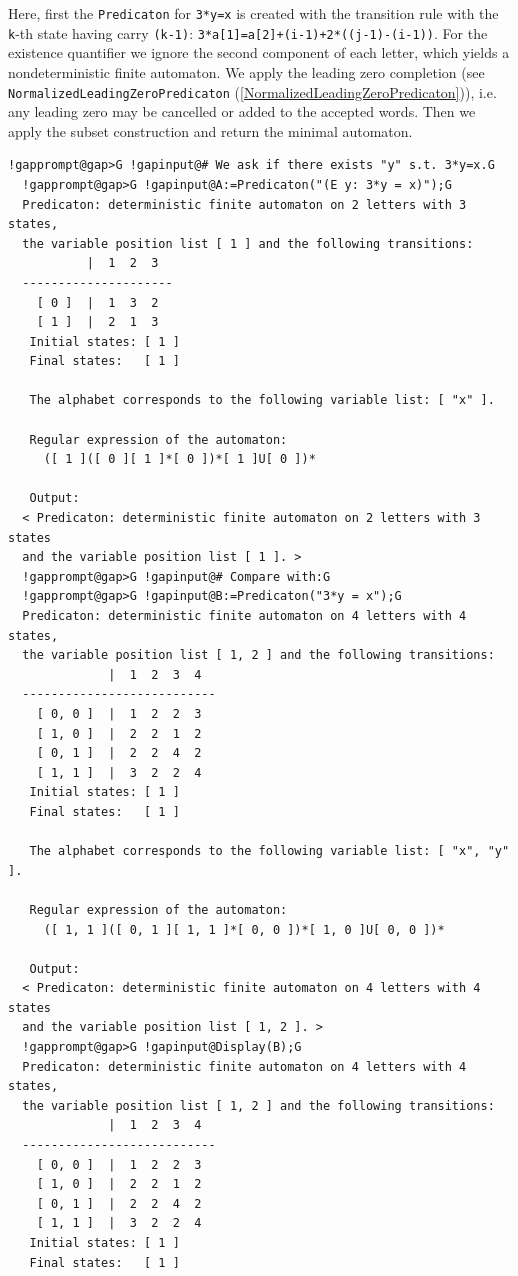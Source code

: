 \documentclass[a4paper,11pt]{report}
\begin{document}
{{{ Here, first the \texttt{Predicaton} for \texttt{3*y=x} is created with the transition rule with the \texttt{k}-th state having carry \texttt{(k-1)}: \texttt{3*a[1]=a[2]+(i-1)+2*((j-1)-(i-1))}. For the existence quantifier we ignore the second component of each letter,
which yields a nondeterministic finite automaton. We apply the leading zero
completion (see \texttt{NormalizedLeadingZeroPredicaton} (\ref{NormalizedLeadingZeroPredicaton})), i.e. any leading zero may be cancelled or added to the accepted words. Then
we apply the subset construction and return the minimal automaton. 
\begin{Verbatim}[commandchars=!@G,fontsize=\small,frame=single,label=Example]
  !gapprompt@gap>G !gapinput@# We ask if there exists "y" s.t. 3*y=x.G
  !gapprompt@gap>G !gapinput@A:=Predicaton("(E y: 3*y = x)");G
  Predicaton: deterministic finite automaton on 2 letters with 3 states, 
  the variable position list [ 1 ] and the following transitions:
           |  1  2  3  
  ---------------------
    [ 0 ]  |  1  3  2  
    [ 1 ]  |  2  1  3  
   Initial states: [ 1 ]
   Final states:   [ 1 ]
  
   The alphabet corresponds to the following variable list: [ "x" ].
  
   Regular expression of the automaton:
     ([ 1 ]([ 0 ][ 1 ]*[ 0 ])*[ 1 ]U[ 0 ])*
  
   Output:
  < Predicaton: deterministic finite automaton on 2 letters with 3 states 
  and the variable position list [ 1 ]. >
  !gapprompt@gap>G !gapinput@# Compare with:G
  !gapprompt@gap>G !gapinput@B:=Predicaton("3*y = x");G
  Predicaton: deterministic finite automaton on 4 letters with 4 states, 
  the variable position list [ 1, 2 ] and the following transitions:
              |  1  2  3  4  
  ---------------------------
    [ 0, 0 ]  |  1  2  2  3  
    [ 1, 0 ]  |  2  2  1  2  
    [ 0, 1 ]  |  2  2  4  2  
    [ 1, 1 ]  |  3  2  2  4  
   Initial states: [ 1 ]
   Final states:   [ 1 ]
  
   The alphabet corresponds to the following variable list: [ "x", "y" ].
  
   Regular expression of the automaton:
     ([ 1, 1 ]([ 0, 1 ][ 1, 1 ]*[ 0, 0 ])*[ 1, 0 ]U[ 0, 0 ])*
  
   Output:
  < Predicaton: deterministic finite automaton on 4 letters with 4 states 
  and the variable position list [ 1, 2 ]. >
  !gapprompt@gap>G !gapinput@Display(B);G
  Predicaton: deterministic finite automaton on 4 letters with 4 states, 
  the variable position list [ 1, 2 ] and the following transitions:
              |  1  2  3  4  
  ---------------------------
    [ 0, 0 ]  |  1  2  2  3  
    [ 1, 0 ]  |  2  2  1  2  
    [ 0, 1 ]  |  2  2  4  2  
    [ 1, 1 ]  |  3  2  2  4  
   Initial states: [ 1 ]
   Final states:   [ 1 ]
  

\end{Verbatim}}}}
\end{document}
